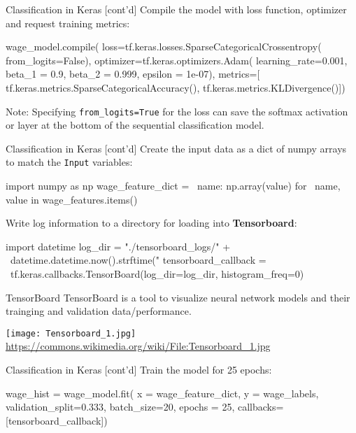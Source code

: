 \documentclass[ignorenonframetext,xcolor=x11names]{beamer}
\begin{document}
\begin{frame}[fragile]{Classification in Keras \small [cont'd]}
Compile the model with loss function, optimizer and request training metrics:
\begin{pythoncode}
wage_model.compile(
    loss=tf.keras.losses.SparseCategoricalCrossentropy(
       from_logits=False),
    optimizer=tf.keras.optimizers.Adam(
        learning_rate=0.001,
        beta_1 = 0.9,
        beta_2 = 0.999,
        epsilon = 1e-07),
    metrics=[
        tf.keras.metrics.SparseCategoricalAccuracy(), 
        tf.keras.metrics.KLDivergence()])
\end{pythoncode}
Note: Specifying \texttt{from\_logits=True} for the loss can save the softmax activation or layer at the bottom of the sequential classification model.
\end{frame}

\begin{frame}[fragile]{Classification in Keras \small [cont'd]}
Create the input data as a dict of numpy arrays to match the \texttt{Input} variables:
\begin{pythoncode}
import numpy as np
wage_feature_dict = \
    {name: np.array(value) for \
        name, value in wage_features.items()}
\end{pythoncode}
Write log information to a directory for loading into \textbf{Tensorboard}:
\begin{pythoncode}
import datetime
log_dir = "./tensorboard_logs/" + \
    datetime.datetime.now().strftime("%
tensorboard_callback = \
    tf.keras.callbacks.TensorBoard(log_dir=log_dir, 
        histogram_freq=0)
\end{pythoncode}
\end{frame}

\begin{frame}{TensorBoard}
TensorBoard is a tool to visualize neural network models and their trainging and validation data/performance.

\vspace{\baselineskip}
\centering
\texttt{[image: Tensorboard\_1.jpg]} \\

\scriptsize \url{https://commons.wikimedia.org/wiki/File:Tensorboard_1.jpg}

\end{frame}

\begin{frame}[fragile]{Classification in Keras \small [cont'd]}
Train the model for 25 epochs:
\begin{pythoncode}
wage_hist = wage_model.fit(
    x = wage_feature_dict,
    y = wage_labels,
    validation_split=0.333,
    batch_size=20,
    epochs = 25,
    callbacks=[tensorboard_callback])
\end{pythoncode}
\end{frame}
\end{document}
